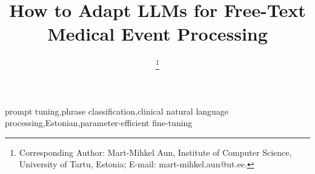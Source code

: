 \documentclass{sty/IOS-Book-Article}
\begin{document}
\begin{frontmatter}
  \title{How to Adapt LLMs for Free-Text Medical Event Processing}

  \author[A]{  \thanks{Corresponding
      Author: Mart-Mihkel Aun, Institute of Computer Science, University
  of Tartu, Estonia; E-mail: mart-mihkel.aun@ut.ee.}}
  \author[A]{ }
  \author[A,B]{ }
  \author[A]{ }
  \author[A,B]{ }
  \author[A]{ }
  \author[A]{ }

  \address[A]{Institute of Computer Science, University of Tartu, Estonia}
  \address[B]{STACC, Estonia}

  \begin{abstract}
    
  \end{abstract}

  \begin{keyword}
    prompt tuning\sep phrase classification\sep clinical natural
    language processing\sep Estonian\sep parameter-efficient fine-tuning
  \end{keyword}
\end{frontmatter}









\end{document}
